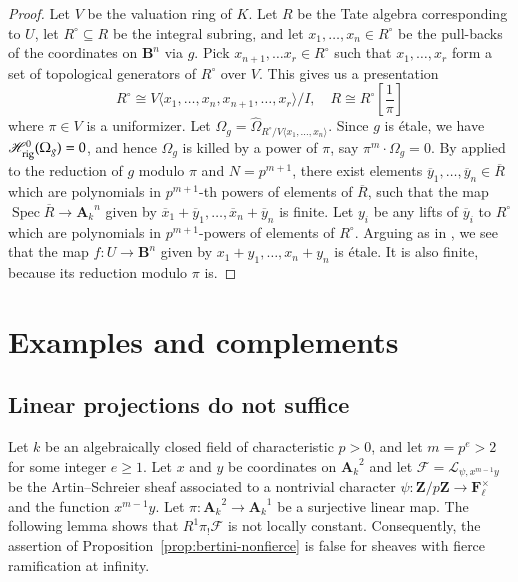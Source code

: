 \documentclass[twoside]{amsart}
\renewcommand{\AA}{\mathbf{A}}
\newcommand{\BB}{\mathbf{B}}
\newcommand{\FF}{\mathbf{F}}
\newcommand{\ZZ}{\mathbf{Z}}
\newcommand{\Ff}{\mathscr{F}}
\newcommand{\Hh}{\mathscr{H}}
\newcommand{\Ll}{\mathscr{L}}
\newcommand{\rig}{{\rm rig}}
\DeclareMathOperator{\Spec}{Spec}
\newcommand{\ANK}[2]{{\AA_{#2}}^{\! \! \! \!  #1}} %
\newcommand{\AN}[1]{\ANK{#1}{k}}
\renewcommand{\to}{\longrightarrow}
\renewcommand{\bar}{\overline}
\theoremstyle{plain}
\theoremstyle{definition}
\theoremstyle{remark}
\numberwithin{equation}{subsection}
\begin{document}
\begin{proof}
Let $V$ be the valuation ring of $K$. Let $R$ be the Tate algebra corresponding to $U$, let $R^\circ\subseteq R$ be the integral subring, and let $x_1, \ldots, x_n\in R^\circ$ be the pull-backs of the coordinates on $\BB^n$ via $g$. Pick $x_{n+1}, \ldots x_r\in R^\circ$ such that $x_1, \ldots, x_r$ form a set of topological generators of $R^\circ$ over $V$. This gives us a presentation
\[ 
	R^\circ \cong V\langle x_1, \ldots, x_n, x_{n+1}, \ldots, x_r\rangle / I, 
	\quad
	R \cong R^\circ\left[\frac{1}{\pi}\right]
\]
where $\pi\in V$ is a uniformizer. Let $\Omega_{g} = \hat\Omega_{R^\circ/V\langle x_1, \ldots, x_n\rangle}$. Since $g$ is \'etale, we have $\Hh^0_\rig(\Omega_g) = 0$, and hence $\Omega_{g}$ is killed by a power of $\pi$, say $\pi^{m}\cdot \Omega_{g} = 0$. By \cite[Proposition~5.4]{Achinger} applied to the reduction of $g$ modulo $\pi$ and $N=p^{m+1}$, there exist elements $\bar y_1, \ldots, \bar y_n \in \bar R$ which are polynomials in $p^{m+1}$-th powers of elements of $\bar R$, such that the map $\Spec \bar R\to \AN n$ given by $\bar x_1 + \bar y_1, \ldots, \bar x_n + \bar y_n$ is finite. Let $y_i$ be any lifts of $\bar y_i$ to $R^\circ$ which are polynomials in $p^{m+1}$-powers of elements of $R^\circ$. Arguing as in \cite[Lemma~5.9]{Achinger}, we see that the map $f\colon U\to \BB^n$ given by $x_1+y_1, \ldots, x_n+y_n$ is \'etale. It is also finite, because its reduction modulo $\pi$ is. 
\end{proof}

\section{Examples and complements} \label{s:complements}

\subsection{Linear projections do not suffice}
\label{ex:linear}

Let $k$ be an algebraically closed field of characteristic $p>0$, and let $m=p^e>2$ for some integer $e\geq 1$. Let $x$ and $y$ be coordinates on $\AN{2}$ and let $\Ff = \Ll_{\psi, x^{m-1}y}$ be the Artin--Schreier sheaf associated to a nontrivial character $\psi\colon \ZZ/p\ZZ\to \FF_\ell^\times$ and the function $x^{m-1}y$. Let $\pi\colon \AN{2} \to \AN{1}$ be a surjective linear map. The following lemma shows that $R^1 \pi_! \Ff$ is not locally constant. Consequently, the assertion of Proposition~\ref{prop:bertini-nonfierce} is false for sheaves with fierce ramification at infinity.
\end{document}
